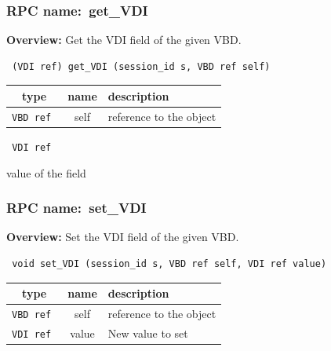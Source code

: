 \vspace{0.3cm}
\vspace{0.3cm}
\vspace{0.3cm}
\subsubsection{RPC name:~get\_VDI}

{\bf Overview:} 
Get the VDI field of the given VBD.

\begin{verbatim} (VDI ref) get_VDI (session_id s, VBD ref self)\end{verbatim}



 
\vspace{0.3cm}
\begin{tabular}{|c|c|p{7cm}|}
 \hline
{\bf type} & {\bf name} & {\bf description} \\ \hline
{\tt VBD ref } & self & reference to the object \\ \hline 

\end{tabular}

\vspace{0.3cm}

{\tt 
VDI ref
}


value of the field
\vspace{0.3cm}
\vspace{0.3cm}
\vspace{0.3cm}
\subsubsection{RPC name:~set\_VDI}

{\bf Overview:} 
Set the VDI field of the given VBD.

\begin{verbatim} void set_VDI (session_id s, VBD ref self, VDI ref value)\end{verbatim}



 
\vspace{0.3cm}
\begin{tabular}{|c|c|p{7cm}|}
 \hline
{\bf type} & {\bf name} & {\bf description} \\ \hline
{\tt VBD ref } & self & reference to the object \\ \hline 

{\tt VDI ref } & value & New value to set \\ \hline 

\end{tabular}

